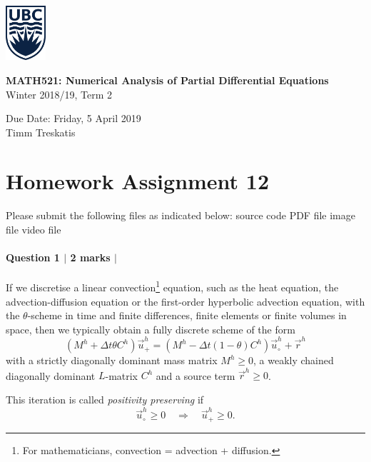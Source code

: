 \documentclass[10pt,letterpaper]{scrartcl}
\begin{document}
\begin{minipage}{.2\textwidth}
\includegraphics[width=42pt]{ubc-logo.png}
\end{minipage}
\hfill
\begin{minipage}{.75\textwidth}
\setlength{\parskip}{6pt}
\begin{flushright}
{
\sffamily
\textbf{MATH521: Numerical Analysis of Partial Differential Equations}\\
Winter 2018/19, Term 2

Due Date: Friday, 5 April 2019\\
Timm Treskatis
}
\end{flushright}
\end{minipage}

\section*{Homework Assignment 12}

Please submit the following files as indicated below: \hfill \faFileCodeO \: source code \hfill \faFilePdfO \: PDF file \hfill \faFilePictureO \: image file \hfill \faFileMovieO \: video file

\paragraph*{Question 1 $\vert$ 2 marks $\vert$ \faFilePdfO}

If we discretise a linear convection\footnote{For mathematicians, convection = advection + diffusion.} equation, such as the heat equation, the advection-diffusion equation or the first-order hyperbolic advection equation, with the $\theta$-scheme in time and finite differences, finite elements or finite volumes in space, then we typically obtain a fully discrete scheme of the form
\begin{equation*}
\left( M^h + \Delta t \theta C^h \right) \vec{u}^h_+ = \left( M^h - \Delta t (1-\theta) C^h \right) \vec{u}^h_\circ + \vec{r}^h
\end{equation*}
with a strictly diagonally dominant mass matrix $M^h \geq 0$, a weakly chained diagonally dominant $L$-matrix $C^h$ and a source term $\vec{r}^h \geq 0$.

This iteration is called \emph{positivity preserving} if
\begin{equation*}
\vec{u}^h_\circ \geq 0 \quad \Longrightarrow \quad  \vec{u}^h_+ \geq 0.
\end{equation*}
\end{document}
